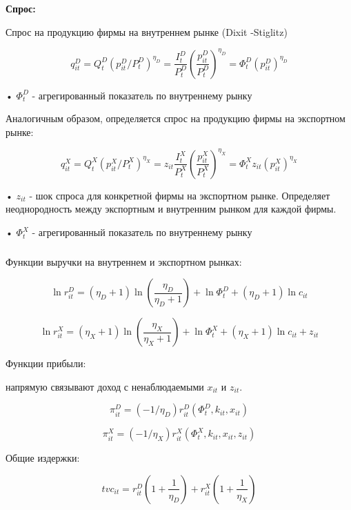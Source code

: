 \documentclass[c, dvipsnames]{beamer}  %
\begin{document}
\begin{frame}[shrink=3]
\frametitle{\insertsection} 


\textbf{Спрос:}

Спрос на продукцию фирмы на внутреннем рынке (Dixit -Stiglitz)

$$q^D_{it} = Q^D_t(p^D_{it} /P^D_t)^{\eta_D} = \dfrac{I^D_t}{P^D_t} \left( \dfrac{p^D_{it}}{P^D_t} \right)^{\eta_D} = \Phi^D_t (p^D_{it} )^{\eta_D}$$ 

•  $\Phi^D_t$ - агрегированный показатель по внутреннему рынку

Аналогичным образом, определяется спрос на продукцию фирмы на экспортном рынке:

$$q^X_{it} = Q^X_t(p^X_{it} /P^X_t)^{\eta_X} = z_{it} \dfrac{I^X_t}{P^X_t} \left( \dfrac{p^X_{it}}{P^X_t} \right)^{\eta_X} = \Phi^X_t z_{it} (p^X_{it} )^{\eta_X}$$ 

• $z_{it}$ - шок спроса для конкретной фирмы на экспортном рынке. Определяет неоднородность между экспортным и внутренним рынком для каждой фирмы.


•  $\Phi^X_t$ - агрегированный показатель по внутреннему рынку


\end{frame}

\begin{frame}[shrink=3]
\frametitle{\insertsection} 

Функции выручки на внутреннем и экспортном рынках:


$$\ln r^D_{it} = (\eta_D + 1) \ln( \frac{\eta_D}{\eta_D + 1}) + \ln \Phi^D_t + (\eta_D + 1)\ln c_{it}$$

$$\ln r^X_{it} = (\eta_X + 1) \ln( \frac{\eta_X}{\eta_X + 1}) + \ln \Phi^X_t + (\eta_X + 1)\ln c_{it} + z_{it}$$


Функции прибыли: 

напрямую связывают доход с ненаблюдаемыми  $x_{it}$ и $z_{it}$.

$$\pi^D_{it} = (−1/\eta_D)r^D_{it} (\Phi^D_t, k_{it}, x_{it})$$

$$\pi^X_{it} = (−1/\eta_X)r^X_{it} (\Phi^X_t, k_{it}, x_{it}, z_{it})$$



Общие издержки:

 $$tvc_{it} = r^D_{it} (1 + \frac{1}{\eta_D}) + r^X_{it} (1 + \frac{1}{\eta_X})$$

\end{frame}
\end{document}
